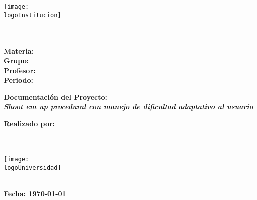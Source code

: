 \begin{titlepage}
    \begin{center}
        \vspace*{1cm}

        \texttt{[image: \\logoInstitucion]}

        \vspace{1cm}

        \textbf{\LARGE \nombreInstituto} \\
        \textbf{\Large \facultad} \\
        \vspace{0.5cm}
        \textbf{\large Materia: \materia} \\
        \textbf{\large Grupo: \grupo} \\
        \vspace{0.5cm}
        \textbf{\large Profesor: \profesora} \\
        \textbf{\large Periodo: \periodo} \\

        \vspace{1cm}

        \textbf{\LARGE Documentación del Proyecto:} \\
        \vspace{0.5cm}
        \textbf{\Large \textit{Shoot em up procedural con manejo de dificultad adaptativo al usuario}} \\

        \vfill

        \textbf{\large Realizado por:} \\
        \textbf{\large \integranteA\\ \integranteB\\ \integranteC}

        \vspace{1cm}

        \texttt{[image: \\logoUniversidad]}

        \vspace{1cm}

        \textbf{\large \facultad} \\
        \textbf{\large Fecha: \today}

    \end{center}
\end{titlepage}